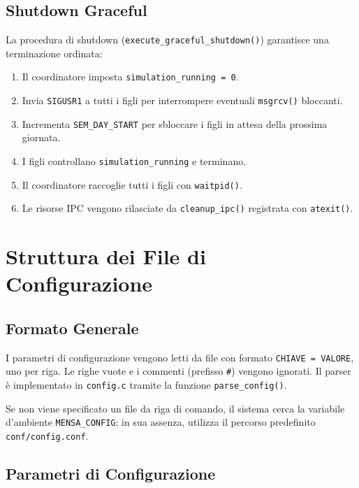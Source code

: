 \documentclass[a4paper,12pt]{article}
\begin{document}
\subsection{Shutdown Graceful}

La procedura di shutdown (\texttt{execute\_graceful\_shutdown()}) garantisce
una terminazione ordinata:

\begin{enumerate}
  \item Il coordinatore imposta \texttt{simulation\_running = 0}.
  \item Invia \texttt{SIGUSR1} a tutti i figli per interrompere
        eventuali \texttt{msgrcv()} bloccanti.
  \item Incrementa \texttt{SEM\_DAY\_START} per sbloccare i figli
        in attesa della prossima giornata.
  \item I figli controllano \texttt{simulation\_running} e terminano.
  \item Il coordinatore raccoglie tutti i figli con \texttt{waitpid()}.
  \item Le risorse IPC vengono rilasciate da \texttt{cleanup\_ipc()}
        registrata con \texttt{atexit()}.
\end{enumerate}

\section{Struttura dei File di Configurazione}

\subsection{Formato Generale}

I parametri di configurazione vengono letti da file con formato
\texttt{CHIAVE = VALORE}, uno per riga. Le righe vuote e i commenti
(prefisso \texttt{\#}) vengono ignorati. Il parser è implementato in
\texttt{config.c} tramite la funzione \texttt{parse\_config()}.

Se non viene specificato un file da riga di comando, il sistema cerca
la variabile d'ambiente \texttt{MENSA\_CONFIG}; in sua assenza, utilizza
il percorso predefinito \texttt{conf/config.conf}.

\subsection{Parametri di Configurazione}
\end{document}
